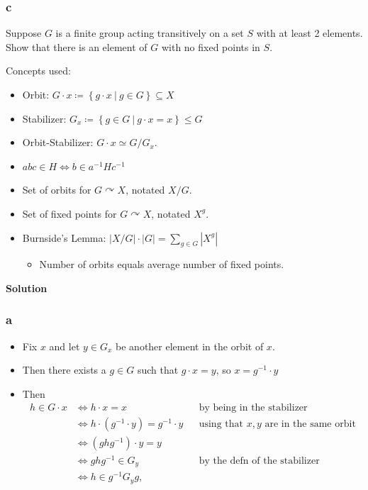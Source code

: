\hypertarget{c-10}{%
\subsubsection{c}\label{c-10}}

Suppose \(G\) is a finite group acting transitively on a set \(S\) with
at least 2 elements. Show that there is an element of \(G\) with no
fixed points in \(S\).

\begin{solution}

Concepts used:

\begin{itemize}
\tightlist
\item
  Orbit:
  \(G\cdot x \coloneqq\left\{{g\cdot x {~\mathrel{\Big|}~}g\in G}\right\} \subseteq X\)
\item
  Stabilizer:
  \(G_x \coloneqq\left\{{g\in G{~\mathrel{\Big|}~}g\cdot x = x}\right\} \leq G\)
\item
  Orbit-Stabilizer: \(G\cdot x \simeq G/G_x\).
\item
  \(abc\in H \iff b\in a^{-1}H c^{-1}\)
\item
  Set of orbits for \(G\curvearrowright X\), notated \(X/G\).
\item
  Set of fixed points for \(G\curvearrowright X\), notated \(X^g\).
\item
  Burnside's Lemma:
  \({\left\lvert {X/G} \right\rvert} \cdot {\left\lvert {G} \right\rvert} = \sum_{g\in G} {\left\lvert {X^g} \right\rvert}\)

  \begin{itemize}
  \tightlist
  \item
    Number of orbits equals average number of fixed points.
  \end{itemize}
\end{itemize}

\textbf{Solution}

\hypertarget{a-18}{%
\subsubsection{a}\label{a-18}}

\begin{itemize}
\tightlist
\item
  Fix \(x\) and let \(y\in G_x\) be another element in the orbit of
  \(x\).
\item
  Then there exists a \(g\in G\) such that \(g\cdot x = y\), so
  \(x = g^{-1}\cdot y\)
\item
  Then
  \begin{align*}
  h \in G\cdot x 
  &\iff h\cdot x = x && \text{by being in the stabilizer} \\
  &\iff h\cdot (g^{-1}\cdot y) = g^{-1}\cdot y && \text{using that $x, y$ are in the same orbit} \\
  &\iff (g h g^{-1}) \cdot y = y \\
  &\iff ghg^{-1}\in G_y && \text{by the defn of the stabilizer}\\
  &\iff h\in g ^{-1}  G_y g
  ,\end{align*}
\end{itemize}


\end{solution}
